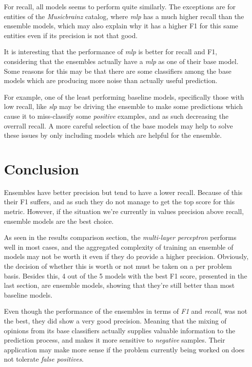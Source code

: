 \documentclass[epsfig,a4paper,11pt,titlepage,twoside,openany]{book}
\begin{document}
For recall, all models seems to perform quite similarly. The exceptions are for entities of the \textit{Musicbrainz} catalog, where \textit{mlp} has a much higher recall than the ensemble models, which may also explain why it has a higher F1 for this same entities even if its precision is not that good.

It is interesting that the performance of \textit{mlp} is better for recall and F1, considering that the ensembles actually have a \textit{mlp} as one of their base model. Some reasons for this may be that there are some classifiers among the base models which are producing more noise than actually useful prediction. 

For example, one of the least performing baseline models, specifically those with low recall, like \textit{slp} may be driving the ensemble to make some predictions which cause it to miss-classify some \textit{positive} examples, and as such decreasing the overrall recall. A more careful selection of the base models may help to solve these issues by only including models which are helpful for the ensemble.


\chapter{Conclusion}
\label{chap:conclusion}

Ensembles have better precision but tend to have a lower recall. Because of this their F1 suffers, and as such they do not manage to get the top score for this metric. However, if the situation we're currently in values precision above recall, ensemble models are the best choice.

As seen in the results comparison section, the \textit{multi-layer perceptron} performs well in most cases, and the aggregated complexity of training an ensemble of models may not be worth it even if they do provide a higher precision. Obviously, the decision of whether this is worth or not must be taken on a per problem basis. Besides this, 4 out of the 5 models with the best F1 score, presented in the last section, are ensemble models, showing that they're still better than most baseline models.

Even though the performance of the ensembles in terms of \textit{F1} and \textit{recall}, was not the best, they did show a very good precision. Meaning that the mixing of opinions from its base classifiers actually supplies valuable information to the prediction process, and makes it more sensitive to \textit{negative} samples. Their application may make more sense if the problem currently being worked on does not tolerate \textit{false positives}.
\end{document}
